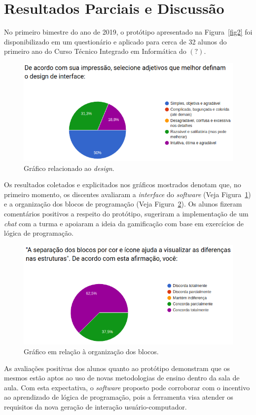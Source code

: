 \documentclass[12pt]{article}
\begin{document}
\section{Resultados Parciais e Discussão}
No primeiro bimestre do ano de 2019, o protótipo apresentado na Figura~\ref{fig2} foi disponibilizado em um questionário e aplicado para cerca de 32 alunos do primeiro ano do Curso Técnico Integrado em Informática do $(?)$.
	\begin{figure}[!htbp]
		\centering
		\includegraphics[scale=0.5]{g1.png}
		\caption{Gráfico relacionado ao \textit{design}.}
		\label{fig3}
	\end{figure}
\par Os resultados coletados e explicitados nos gráficos mostrados denotam que, no primeiro momento, os discentes avaliaram a \textit{interface} do \textit{software} (Veja Figura~\ref{fig3}) e a organização dos blocos de programação (Veja Figura~\ref{fig4}). Os alunos fizeram comentários positivos a respeito do protótipo, sugeriram a implementação de um \textit{chat} com a turma e apoiaram a ideia da gamificação com base em exercícios de lógica de programação.
	\begin{figure}[!htbp]
		\centering
		\includegraphics[scale=0.5]{g2.png}
		\caption{Gráfico em relação à organização dos blocos.}
		\label{fig4}
	\end{figure} 
\par As avaliações positivas dos alunos quanto ao protótipo demonstram que os mesmos estão aptos ao uso de novas metodologias de ensino dentro da sala de aula. Com esta expectativa, o \textit{software} proposto pode corroborar com o incentivo ao aprendizado de lógica de programação, pois a ferramenta visa atender os requisitos da nova geração de interação usuário-computador. 	
\end{document}
